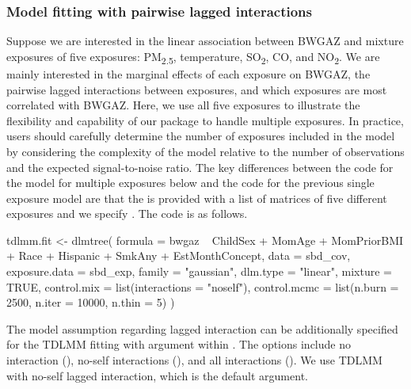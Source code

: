 \subsubsection{Model fitting with pairwise lagged interactions}
Suppose we are interested in the linear association between BWGAZ and mixture exposures of five exposures: PM\textsubscript{2.5}, temperature, SO\textsubscript{2}, CO, and NO\textsubscript{2}. We are mainly interested in the marginal effects of each exposure on BWGAZ, the pairwise lagged interactions between exposures, and which exposures are most correlated with BWGAZ.  Here, we use all five exposures to illustrate the flexibility and capability of our package to handle multiple exposures. In practice, users should carefully determine the number of exposures included in the model by considering the complexity of the model relative to the number of observations and the expected signal-to-noise ratio. The key differences between the code for the model for multiple exposures below and the code for the previous single exposure model are that the  is provided with a list of matrices of five different exposures and we specify . The code is as follows.

\begin{example}
tdlmm.fit <- dlmtree(
    formula = bwgaz ~ ChildSex + MomAge + MomPriorBMI +
                        Race + Hispanic + SmkAny + EstMonthConcept,
    data = sbd_cov,
    exposure.data = sbd_exp,
    family = "gaussian",
    dlm.type = "linear",
    mixture = TRUE,
    control.mix = list(interactions = "noself"),
    control.mcmc = list(n.burn = 2500, n.iter = 10000, n.thin = 5)
)
\end{example}
The model assumption regarding lagged interaction can be additionally specified for the TDLMM fitting with  argument within . The options include no interaction (), no-self interactions (), and all interactions (). We use TDLMM with no-self lagged interaction, which is the default argument.

